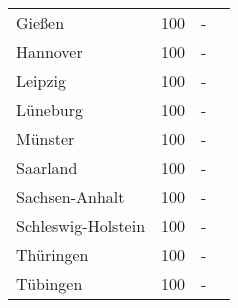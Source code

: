 \begin{table}[H]
\begin{tabularx}{\textwidth}{Xccc}
            Gießen & 100 & - \\
            Hannover & 100 & - \\
            Leipzig & 100 & - \\
            Lüneburg & 100 & - \\
            Münster & 100 & - \\
            Saarland & 100 & - \\
            Sachsen-Anhalt & 100 & - \\
            Schleswig-Holstein & 100 & - \\
            Thüringen & 100 & - \\
            Tübingen & 100 & - \\
        \bottomrule
    \end{tabularx}
\end{table}
        